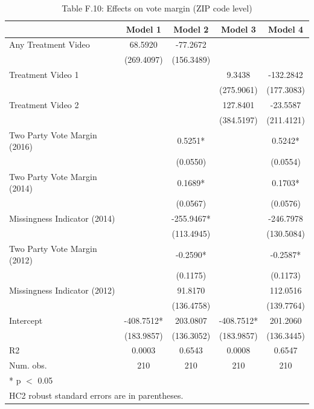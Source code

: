 \begin{table}
\centering
\caption{Table F.10: Effects on vote margin (ZIP code level)}
\centering
\begin{tabular}[t]{lcccc}
\toprule
  & Model 1 & Model 2 & Model 3 & Model 4\\
\midrule
Any Treatment Video & 68.5920 & -77.2672 &  & \\
 & (269.4097) & (156.3489) &  & \\
Treatment Video 1 &  &  & 9.3438 & -132.2842\\
 &  &  & (275.9061) & (177.3083)\\
Treatment Video 2 &  &  & 127.8401 & -23.5587\\
 &  &  & (384.5197) & (211.4121)\\
Two Party Vote Margin (2016) &  & 0.5251* &  & 0.5242*\\
 &  & (0.0550) &  & (0.0554)\\
Two Party Vote Margin (2014) &  & 0.1689* &  & 0.1703*\\
 &  & (0.0567) &  & (0.0576)\\
Missingness Indicator (2014) &  & -255.9467* &  & -246.7978\\
 &  & (113.4945) &  & (130.5084)\\
Two Party Vote Margin (2012) &  & -0.2590* &  & -0.2587*\\
 &  & (0.1175) &  & (0.1173)\\
Missingness Indicator (2012) &  & 91.8170 &  & 112.0516\\
 &  & (136.4758) &  & (139.7764)\\
Intercept & -408.7512* & 203.0807 & -408.7512* & 201.2060\\
 & (183.9857) & (136.3052) & (183.9857) & (136.3445)\\
\midrule
R2 & 0.0003 & 0.6543 & 0.0008 & 0.6547\\
Num. obs. & 210 & 210 & 210 & 210\\
\bottomrule
\multicolumn{5}{l}{\rule{0pt}{1em}* p $<$ 0.05}\\
\multicolumn{5}{l}{\rule{0pt}{1em}HC2 robust standard errors are in parentheses.}\\
\end{tabular}
\end{table}
